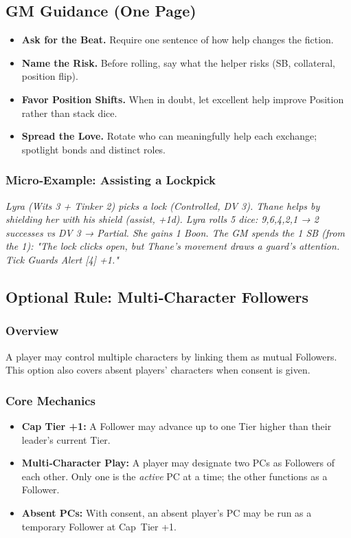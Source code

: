 \subsection{GM Guidance (One Page)}
\label{sec:coord-gm}
\begin{itemize}
  \item \textbf{Ask for the Beat.} Require one sentence of how help changes the fiction.
  \item \textbf{Name the Risk.} Before rolling, say what the helper risks (SB, collateral, position flip).
  \item \textbf{Favor Position Shifts.} When in doubt, let excellent help improve Position rather than stack dice.
  \item \textbf{Spread the Love.} Rotate who can meaningfully help each exchange; spotlight bonds and distinct roles.
\end{itemize}

\subsubsection*{Micro‑Example: Assisting a Lockpick}
\emph{Lyra (Wits 3 + Tinker 2) picks a lock (Controlled, DV 3). Thane helps by shielding her with his shield (assist, +1d). Lyra rolls 5 dice: 9,6,4,2,1 → 2 successes vs DV 3 → Partial. She gains 1 Boon. The GM spends the 1 SB (from the 1): "The lock clicks open, but Thane's movement draws a guard's attention. Tick Guards Alert [4] +1."}

\subsection{Optional Rule: Multi‑Character Followers}
\label{sec:multi-character-followers}

\subsubsection*{Overview}
A player may control multiple characters by linking them as mutual Followers. This option also covers absent players' characters when consent is given.

\subsubsection*{Core Mechanics}
\begin{itemize}
  \item \textbf{Cap Tier +1:} A Follower may advance up to one Tier higher than their leader's current Tier.
  \item \textbf{Multi‑Character Play:} A player may designate two PCs as Followers of each other. Only one is the \emph{active} PC at a time; the other functions as a Follower.
  \item \textbf{Absent PCs:} With consent, an absent player's PC may be run as a temporary Follower at Cap~Tier +1.
\end{itemize}

